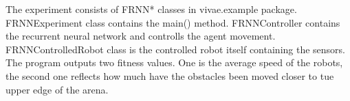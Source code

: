 The experiment consists of FRNN* classes in vivae.example package. FRNNExperiment class contains the main() method. FRNNController contains the recurrent neural network and controlls the agent movement. FRNNControlledRobot class is the controlled robot itself containing the sensors. The program outputs two fitness values. One is the average speed of the robots, the second one reflects how much have the obstacles been moved closer to tue upper edge of the arena.

